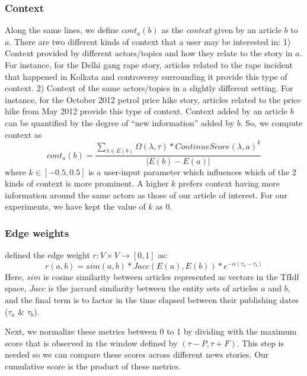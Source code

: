 \subsubsection*{Context}
Along the same lines, we define $cont_{a}(b)$ as the \emph{context} given by an article $b$ to $a$. There are two different kinds of context that a user may be interested in: 1) Context provided by different actors/topics and how they relate
to the story in $a$. For instance, for the Delhi gang rape story, articles related to the rape incident that happened in Kolkata and controversy surrounding it provide this type of context. 2) Context of the same actors/topics in a slightly different setting. For instance, for the October 2012 petrol price hike story, articles related to the price hike from May 2012 provide this type of context. Context added by an article $b$ can be quantified by the degree of ``new information'' added by $b$.
So, we compute context as
\begin{equation}
cont_{a}(b) = \frac{\sum_{\lambda \in E(b)}{\Omega(\lambda, \tau)*ContinueScore(\lambda, a)^{k}}}{|E(b) - E(a)|}
\end{equation}
where $k \in [-0.5, 0.5]$ is a user-input parameter which influences which of the 2 kinds of context is more prominent. A higher $k$ prefers context having more information
around the same actors as those of our article of interest. For our experiments, we have kept the value of $k$ as 0.

\subsubsection*{Edge weights}
\cite{choudhary@ecir2008} defined the edge weight $r:V \times V \rightarrow [0,1]$ as:
\begin{equation}
r(a, b) = sim(a,b) * Jacc(E(a), E(b)) * e^{-\alpha(\tau_a - \tau_b)}
\end{equation}
Here, $sim$ is cosine similarity between articles represented as vectors in the TfIdf space, $Jacc$ is the jaccard similarity between
the entity sets of articles $a$ and $b$, and the final term is to factor in the time elapsed between their publishing dates ($\tau_a$ \& $\tau_b$).

Next, we normalize these metrics between 0 to 1 by dividing with the maximum score that is observed in the window defined by $(\tau - P, \tau + F)$. This
step is needed so we can compare these scores across different news stories. Our cumulative score is the product of these metrics.

